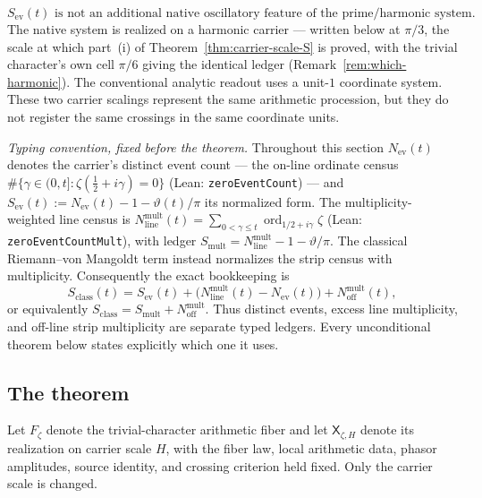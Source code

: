 \documentclass[11pt]{article}
\theoremstyle{definition}
\begin{document}
\[
\boxed{
S_{\mathrm{ev}}(t)\text{ is not an additional native oscillatory feature of the
prime/harmonic system.}
}
\]
The native system is realized on a harmonic carrier --- written below at
\(\pi/3\), the scale at which part~(i) of Theorem~\ref{thm:carrier-scale-S} is
proved, with the trivial character's own cell \(\pi/6\) giving the identical
ledger (Remark~\ref{rem:which-harmonic}).  The conventional analytic readout
uses a unit-\(1\) coordinate system.  These two carrier scalings represent the
same arithmetic procession, but they do not register the same crossings in the
same coordinate units.

\emph{Typing convention, fixed before the theorem.} Throughout this section
\(N_{\mathrm{ev}}(t)\) denotes the carrier's distinct event count --- the
on-line ordinate census
\(\#\{\gamma\in(0,t]:\zeta(\tfrac12+i\gamma)=0\}\) (Lean:
\texttt{zeroEventCount}) --- and
\(S_{\mathrm{ev}}(t):=N_{\mathrm{ev}}(t)-1-\vartheta(t)/\pi\) its normalized
form.  The multiplicity-weighted line census is
\(N_{\mathrm{line}}^{\mathrm{mult}}(t)=\sum_{0<\gamma\le t}
\operatorname{ord}_{1/2+i\gamma}\zeta\) (Lean:
\texttt{zeroEventCountMult}), with ledger
\(S_{\mathrm{mult}}=N_{\mathrm{line}}^{\mathrm{mult}}-1-\vartheta/\pi\).
The classical Riemann--von Mangoldt term instead normalizes the strip census
with multiplicity.  Consequently the exact bookkeeping is
\[
 S_{\mathrm{class}}(t)
 =S_{\mathrm{ev}}(t)
  +\bigl(N_{\mathrm{line}}^{\mathrm{mult}}(t)-N_{\mathrm{ev}}(t)\bigr)
  +N_{\mathrm{off}}^{\mathrm{mult}}(t),
\]
or equivalently
\(S_{\mathrm{class}}=S_{\mathrm{mult}}+N_{\mathrm{off}}^{\mathrm{mult}}\).
Thus distinct events, excess line multiplicity, and off-line strip
multiplicity are separate typed ledgers.  Every unconditional theorem below
states explicitly which one it uses.

\subsection{The theorem}
Let \(F_\zeta\) denote the trivial-character arithmetic fiber and let
\(\mathsf X_{\zeta,H}\) denote its realization on carrier scale \(H\), with the
fiber law, local arithmetic data, phasor amplitudes, source identity, and
crossing criterion held fixed.  Only the carrier scale is changed.
\end{document}
